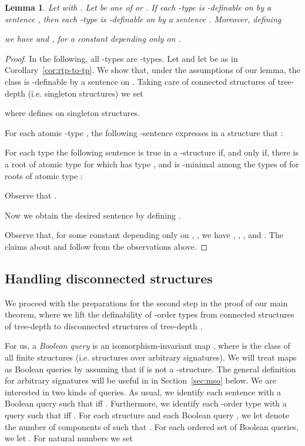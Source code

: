 \documentclass[11pt]{article}
\newtheorem{lemma}[theorem]{Lemma}
\begin{document}
\begin{lemma}
  \label{lem:connected-lift}
  Let  with . Let  be one of
   or . If each -type
   is
  -definable on  by a sentence
  , then each -type
   is -definable on
   by a sentence .
  Moreover, defining
  
  we have  and , for a constant  depending only on .
\end{lemma}
\begin{proof}
  In the following, all -types are
  -types.  Let
   and let  be as in
  Corollary~\ref{cor:rtp-to-tp}. We show that, under the assumptions
  of our lemma, the class
   is
  -definable by a sentence  on
  . Taking care of connected structures of
  tree-depth  (i.e. singleton structures) we set
  
  where  defines  on singleton structures.

  For each atomic -type , the following
  -sentence  expresses in a structure
   that :
  
  For each type  the following sentence
  is true in a -structure  if, and only if, there is a root  of
  atomic type  for which  has type , and  is
  -minimal among the types of  for roots  of
  atomic type :
  
  Observe that .
  
  Now we obtain the desired sentence by
  defining .

  Observe that, for some constant  depending only on , , we have
  , , , and  
  .
  The claims about  and  follow from the observations above. 
\end{proof}

\subsection{Handling disconnected structures}

We proceed with the preparations for the second step in the proof of
our main theorem, where we lift the definability of -order types
from connected structures of tree-depth  to disconnected
structures of tree-depth .

For us, a \emph{Boolean query} is an isomorphism-invariant map , where  is the class of all finite structures (i.e. structures
over arbitrary signatures). We will treat maps 
as Boolean queries by assuming that  if  is not a
-structure. The general definition for arbitrary signatures will be
useful in in Section~\ref{sec:mso} below.  We are interested in two kinds of
queries.  As usual, we identify each sentence  with a Boolean query such
that  iff .  Furthermore, we identify each
-order type  with a query such that  iff
. For each structure  and each Boolean query ,
we let  denote the number of components  of  such that
.  For each ordered set  of Boolean
queries, we let .  For
natural numbers  we set
\end{document}
